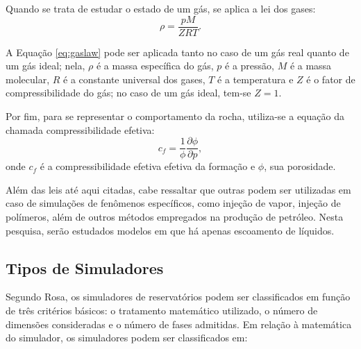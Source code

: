 Quando se trata de estudar o estado de um g\'{a}s, se aplica a lei dos gases:
\begin{equation}\label{eq:gaslaw}
	\rho = \frac{pM}{ZRT}.
\end{equation}

A Equa\c{c}\~{a}o \eqref{eq:gaslaw} pode ser aplicada tanto no caso de um g\'{a}s real quanto de um g\'{a}s ideal; nela, $\rho$ \'{e} a massa espec\'{i}fica do g\'{a}s, $p$ \'{e} a press\~{a}o, $M$ \'{e} a massa molecular, $R$ \'{e} a constante universal dos gases, $T$ \'{e} a temperatura e $Z$ \'{e} o fator de compressibilidade do g\'{a}s; no caso de um g\'{a}s ideal, tem-se $Z = 1$.

Por fim, para se representar o comportamento da rocha, utiliza-se a equa\c{c}\~{a}o da chamada compressibilidade efetiva:
\begin{equation}
	c_f = \frac{1}{\phi} \frac{\partial\phi}{\partial p},
\end{equation}
onde $c_f$ \'{e} a compressibilidade efetiva efetiva da forma\c{c}\~{a}o e $\phi$, sua porosidade.

Al\'{e}m das leis at\'{e} aqui citadas, cabe ressaltar que outras podem ser utilizadas em caso de simula\c{c}\~{o}es de fen\^{o}menos espec\'{i}ficos, como inje\c{c}\~{a}o de vapor, inje\c{c}\~{a}o de pol\'{i}meros, al\'{e}m de outros m\'{e}todos empregados na produ\c{c}\~{a}o de petr\'{o}leo. Nesta pesquisa, ser\~{a}o estudados modelos em que h\'{a} apenas escoamento de l\'{i}quidos.

\subsection{Tipos de Simuladores}
Segundo Rosa, os simuladores de reservat\'{o}rios podem ser classificados em fun\c{c}\~{a}o de tr\^{e}s crit\'{e}rios b\'{a}sicos: o tratamento matem\'{a}tico utilizado, o n\'{u}mero de dimens\~{o}es consideradas e o n\'{u}mero de fases admitidas. Em rela\c{c}\~{a}o \`{a} matem\'{a}tica do simulador, os simuladores podem ser classificados em: 

